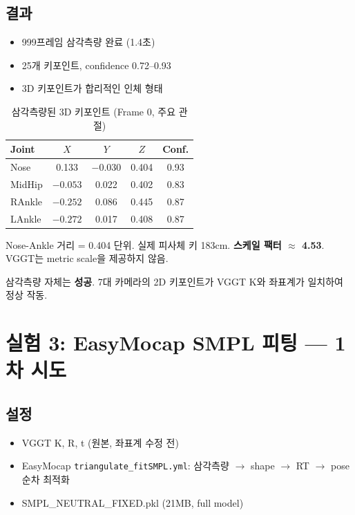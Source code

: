 \documentclass[11pt, a4paper]{report}
\begin{document}
\section{결과}
\begin{itemize}[leftmargin=*]
  \item 999프레임 삼각측량 완료 (1.4초)
  \item 25개 키포인트, confidence 0.72--0.93
  \item 3D 키포인트가 합리적인 인체 형태
\end{itemize}

\begin{table}[H]
\centering
\caption{삼각측량된 3D 키포인트 (Frame 0, 주요 관절)}
\renewcommand{\arraystretch}{1.2}
\begin{tabular}{l ccc c}
\toprule
\textbf{Joint} & $X$ & $Y$ & $Z$ & \textbf{Conf.} \\
\midrule
Nose & 0.133 & $-0.030$ & 0.404 & 0.93 \\
MidHip & $-0.053$ & 0.022 & 0.402 & 0.83 \\
RAnkle & $-0.252$ & 0.086 & 0.445 & 0.87 \\
LAnkle & $-0.272$ & 0.017 & 0.408 & 0.87 \\
\bottomrule
\end{tabular}
\end{table}

\begin{warningbox}
Nose-Ankle 거리 = 0.404 단위. 실제 피사체 키 183cm. \textbf{스케일 팩터 $\approx$ 4.53}. VGGT는 metric scale을 제공하지 않음.
\end{warningbox}

\begin{summary}
삼각측량 자체는 \textcolor{thmgreen}{\textbf{성공}}. 7대 카메라의 2D 키포인트가 VGGT K와 좌표계가 일치하여 정상 작동.
\end{summary}


\chapter{실험 3: EasyMocap SMPL 피팅 --- 1차 시도}

\section{설정}
\begin{itemize}[leftmargin=*]
  \item VGGT K, R, t (원본, 좌표계 수정 전)
  \item EasyMocap \texttt{triangulate\_fitSMPL.yml}: 삼각측량 $\rightarrow$ shape $\rightarrow$ RT $\rightarrow$ pose 순차 최적화
  \item SMPL\_NEUTRAL\_FIXED.pkl (21MB, full model)
\end{itemize}
\end{document}
